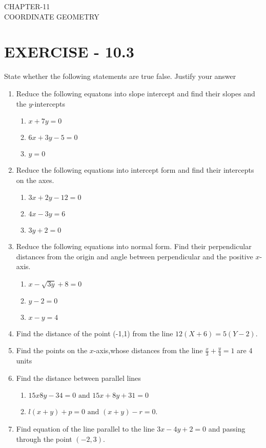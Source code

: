 \documentclass[12pt]{article}
\begin{document}
\begin{center}
\textbf\large{CHAPTER-11 \\ COORDINATE GEOMETRY}
\end{center}

\section*{EXERCISE - 10.3}
State whether the following statements are true false. Justify your answer
\begin{enumerate}
\item Reduce the following equatons into slope intercept and find their slopes and the $y$-intercepts 
\begin {enumerate}
\item $ x+7y=0 $
\item $ 6x+3y-5=0 $
\item $ y=0 $
\end{enumerate}
\item Reduce the following equations into intercept form and find their intercepts on the axes.
\begin {enumerate}
\item $ 3x+2y-12=0$
\item $ 4x-3y=6 $
\item $ 3y+2=0 $
\end {enumerate}
\item Reduce the following equations into normal form. Find their perpendicular distances from the origin and angle between perpendicular and the positive $x$-axis.
\begin {enumerate}
\item $ x-\sqrt{3y}+8=0 $
\item $ y-2=0 $
\item $ x-y=4 $
\end {enumerate}
\item Find the distance of the point (-1,1) from the line $ 12(X+6)= 5(Y-2)$.
\item Find the points on the $x$-axis,whose distances from the line $\frac{x}{3}+\frac{y}{4}=1 $ are 4 units
\item Find the distance between parallel lines 
\begin {enumerate}
\item $ 15x8y-34=0 \text{ and }15x+8y+31=0 $
\item $ l (x+y)+p=0 \text{ and }(x+y)-r=0$.
\end{enumerate}
\item Find equation of the line parallel to the line $ 3x-4y+2=0 $ and passing through the point $(-2,3)$.

\end{enumerate}
\end{document}
